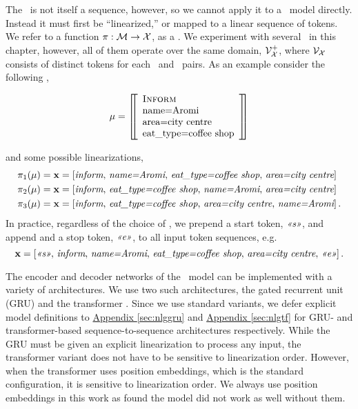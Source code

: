 The \meaningrepresentation~is not itself a sequence, however, so we cannot
apply it to a \sequencetosequence~model directly.  Instead it must first be
``linearized,'' or mapped to a linear sequence of tokens. We refer to a
function $\pi : \mathcal{M} \rightarrow \mathcal{X}$, as a \linearizationstrategy.
We experiment with several \linearizationstrategies~in this chapter, however,
all of them operate over the same domain, $\mathcal{V}_{\mathcal{X}}^+$, where $\mathcal{V}_{\mathcal{X}}$
consists of distinct tokens for each \dialogueact~and \attributevalue~pairs.
As an example consider the following \meaningrepresentation,
\begin{singlespace}
  \[ 
    \mu = \left[\!\!\left[\begin{array}{l} \textsc{Inform} \\ \textrm{name=Aromi}\\\textrm{area=city centre} \\ \textrm{eat\_type=coffee shop} \end{array}\right]\!\!\right] \]
\end{singlespace}
\noindent and some possible linearizations,
\begin{align*}
     \pi_1(\mu) & = \mathbf{x}= \left[\textit{inform},\,\textit{name=Aromi},\,\textit{eat\_type=coffee shop},\,\textit{area=city centre}\right] \\
     \pi_2(\mu) & = \mathbf{x}= \left[\textit{inform},\,\textit{eat\_type=coffee shop},\,\textit{name=Aromi},\,\textit{area=city centre}\right] \\
     \pi_3(\mu) & = \mathbf{x}= \left[\textit{inform},\,\textit{eat\_type=coffee shop},\,\textit{area=city centre},\,\textit{name=Aromi}\right].
\end{align*}
In practice, regardless of the choice of \linearizationstrategy, we prepend a
start token, $\textit{<<s>>}$, and append and a stop token, $\textit{<<e>>}$, to all
input token sequences, e.g.
\[ \mathbf{x} = \left[\textit{<<s>>},\,\textit{inform},\,\textit{name=Aromi},\,\textit{eat\_type=coffee shop},\,\textit{area=city centre},\,\textit{<<e>>}\right]. \]

The encoder and decoder networks of the \sequencetosequence~model can be
implemented with a variety of architectures. We use two such architectures, the
gated recurrent unit (GRU) \citep{cho2014learning} and the transformer
\citep{vaswani2017}. Since we use standard variants, we defer explicit model
definitions to \hyperref[sec:nlggru]{Appendix \ref{sec:nlggru}} and
\hyperref[sec:nlgtf]{Appendix \ref{sec:nlgtf}} for GRU- and transformer-based
sequence-to-sequence architectures respectively. While the GRU must be given an
explicit linearization to process any input, the transformer variant does not
have to be sensitive to linearization order. However, when the transformer uses
position embeddings, which is the standard configuration, it is sensitive to
linearization order. We always use position embeddings in this work as
\cite{vaswani2017} found the model did not work as well without them.

